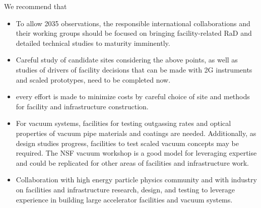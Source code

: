 We recommend that
\begin{itemize}
\item To allow 2035 observations, the responsible international collaborations and their working groups should be focused on bringing facility-related \ac{RaD} and detailed technical studies to maturity imminently.
\item Careful study of candidate sites considering the above points, as well as studies of drivers of facility decisions that can be made with 2G instruments and scaled prototypes, need to be completed now. 
\item  every effort  is made to minimize costs by careful choice of site and methods for facility and infrastructure construction.
\item For vacuum systems, facilities for testing outgassing rates and optical properties of vacuum pipe materials and coatings are needed. Additionally, as design studies progress, facilities to test scaled vacuum concepts may be required.
The NSF vacuum workshop is a good model for leveraging expertise and could be replicated for other areas of facilities and infrastructure work.
\item Collaboration with high energy particle physics community and with industry on facilities and infrastructure research, design, and testing  to leverage experience in building large accelerator facilities and vacuum systems.
\end{itemize}



